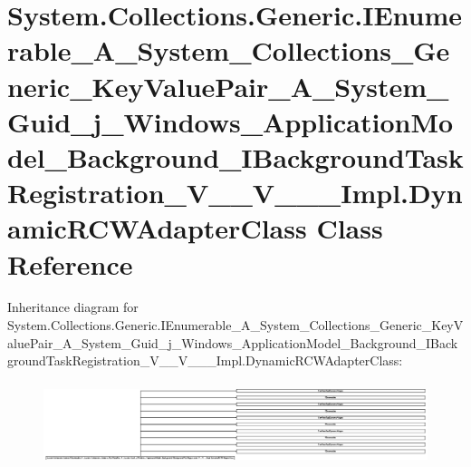 \hypertarget{class_system_1_1_collections_1_1_generic_1_1_i_enumerable___a___system___collections___generic__6011cb6f01f64fc6f2b474236e96d61a}{}\section{System.\+Collections.\+Generic.\+I\+Enumerable\+\_\+\+A\+\_\+\+System\+\_\+\+Collections\+\_\+\+Generic\+\_\+\+Key\+Value\+Pair\+\_\+\+A\+\_\+\+System\+\_\+\+Guid\+\_\+j\+\_\+\+Windows\+\_\+\+Application\+Model\+\_\+\+Background\+\_\+\+I\+Background\+Task\+Registration\+\_\+\+V\+\_\+\+\_\+\+V\+\_\+\+\_\+\+\_\+\+Impl.\+Dynamic\+R\+C\+W\+Adapter\+Class Class Reference}
\label{class_system_1_1_collections_1_1_generic_1_1_i_enumerable___a___system___collections___generic__6011cb6f01f64fc6f2b474236e96d61a}
Inheritance diagram for System.\+Collections.\+Generic.\+I\+Enumerable\+\_\+\+A\+\_\+\+System\+\_\+\+Collections\+\_\+\+Generic\+\_\+\+Key\+Value\+Pair\+\_\+\+A\+\_\+\+System\+\_\+\+Guid\+\_\+j\+\_\+\+Windows\+\_\+\+Application\+Model\+\_\+\+Background\+\_\+\+I\+Background\+Task\+Registration\+\_\+\+V\+\_\+\+\_\+\+V\+\_\+\+\_\+\+\_\+\+Impl.\+Dynamic\+R\+C\+W\+Adapter\+Class\+:\begin{figure}[H]
\begin{center}
\leavevmode
\includegraphics[height=2.425197cm]{class_system_1_1_collections_1_1_generic_1_1_i_enumerable___a___system___collections___generic__6011cb6f01f64fc6f2b474236e96d61a}
\end{center}
\end{figure}
